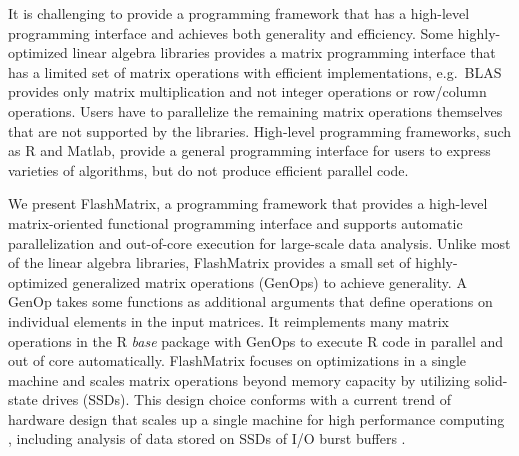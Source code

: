
It is challenging to provide a programming framework that has a high-level
programming interface and achieves both generality and efficiency.
Some highly-optimized linear algebra libraries \cite{mkl, openblas, elemental,
trilinos, petsc} provides a matrix programming interface that has a limited
set of matrix operations with efficient implementations, e.g.~BLAS provides
only matrix multiplication and not integer operations or row/column operations.
Users have to parallelize the remaining matrix
operations themselves that are not supported by the libraries. 
High-level programming frameworks, such as R and Matlab, provide a
general programming interface for users to express varieties of algorithms, but
do not produce efficient parallel code.


We present FlashMatrix, a programming framework that provides a high-level
matrix-oriented functional programming interface and supports automatic
parallelization and out-of-core execution for large-scale data analysis.
Unlike most of the linear algebra libraries, FlashMatrix provides a small
set of highly-optimized generalized matrix operations (GenOps) to achieve
generality. A GenOp takes some functions as additional arguments that
define operations on individual elements in the input matrices.
It reimplements many matrix operations in the R \textit{base} package with
GenOps to execute R code in parallel and
out of core automatically. FlashMatrix focuses on optimizations in
a single machine and scales matrix operations beyond memory capacity by utilizing
solid-state drives (SSDs). This design choice conforms with a current trend of
hardware design that scales up a single machine for high performance computing
\cite{Ang14}, including analysis of data stored on SSDs of I/O burst buffers
\cite{burst}.

